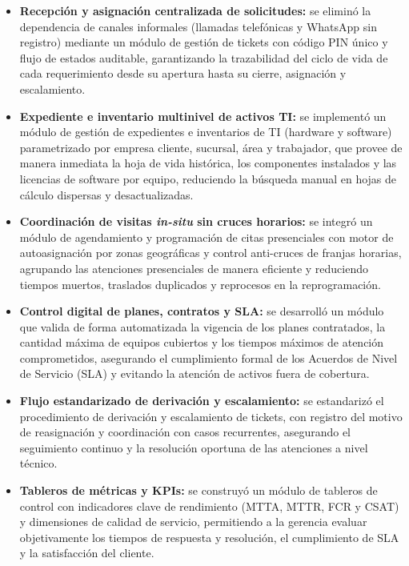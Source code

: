 \begin{itemize}[leftmargin=1.27cm]
    \item \textbf{Recepción y asignación centralizada de solicitudes:} se eliminó la dependencia de canales informales (llamadas telefónicas y WhatsApp sin registro) mediante un módulo de gestión de tickets con código PIN único y flujo de estados auditable, garantizando la trazabilidad del ciclo de vida de cada requerimiento desde su apertura hasta su cierre, asignación y escalamiento.

    \item \textbf{Expediente e inventario multinivel de activos TI:} se implementó un módulo de gestión de expedientes e inventarios de TI (hardware y software) parametrizado por empresa cliente, sucursal, área y trabajador, que provee de manera inmediata la hoja de vida histórica, los componentes instalados y las licencias de software por equipo, reduciendo la búsqueda manual en hojas de cálculo dispersas y desactualizadas.

    \item \textbf{Coordinación de visitas \textit{in-situ} sin cruces horarios:} se integró un módulo de agendamiento y programación de citas presenciales con motor de autoasignación por zonas geográficas y control anti-cruces de franjas horarias, agrupando las atenciones presenciales de manera eficiente y reduciendo tiempos muertos, traslados duplicados y reprocesos en la reprogramación.

    \item \textbf{Control digital de planes, contratos y SLA:} se desarrolló un módulo que valida de forma automatizada la vigencia de los planes contratados, la cantidad máxima de equipos cubiertos y los tiempos máximos de atención comprometidos, asegurando el cumplimiento formal de los Acuerdos de Nivel de Servicio (SLA) y evitando la atención de activos fuera de cobertura.

    \item \textbf{Flujo estandarizado de derivación y escalamiento:} se estandarizó el procedimiento de derivación y escalamiento de tickets, con registro del motivo de reasignación y coordinación con casos recurrentes, asegurando el seguimiento continuo y la resolución oportuna de las atenciones a nivel técnico.

    \item \textbf{Tableros de métricas y KPIs:} se construyó un módulo de tableros de control con indicadores clave de rendimiento (MTTA, MTTR, FCR y CSAT) y dimensiones de calidad de servicio, permitiendo a la gerencia evaluar objetivamente los tiempos de respuesta y resolución, el cumplimiento de SLA y la satisfacción del cliente.
\end{itemize}

